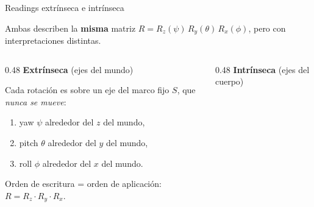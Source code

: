 \documentclass[11pt]{beamer}
\begin{document}


\begin{frame}{Readings extrínseca e intrínseca}

Ambas describen la \textbf{misma} matriz \(R = R_z(\psi)\,R_y(\theta)\,R_x(\phi)\),
pero con interpretaciones distintas.

\medskip
\begin{columns}[T]

  \begin{column}{0.48\textwidth}
    \textbf{Extrínseca} (ejes del mundo)

    \smallskip
    Cada rotación es sobre un eje del marco fijo \(S\), que \emph{nunca se mueve}:
    \begin{enumerate}\small
      \item yaw \(\psi\) alrededor del \(z\) del mundo,
      \item pitch \(\theta\) alrededor del \(y\) del mundo,
      \item roll \(\phi\) alrededor del \(x\) del mundo.
    \end{enumerate}

    \smallskip

    \smallskip
    {\footnotesize Orden de escritura = orden de aplicación:\\
    \(R = R_z \cdot R_y \cdot R_x\).}
  \end{column}

  \vrule\hspace{4pt}

  \begin{column}{0.48\textwidth}
    \textbf{Intrínseca} (ejes del cuerpo)


\end{column}
\end{columns}
\end{frame}
\end{document}
